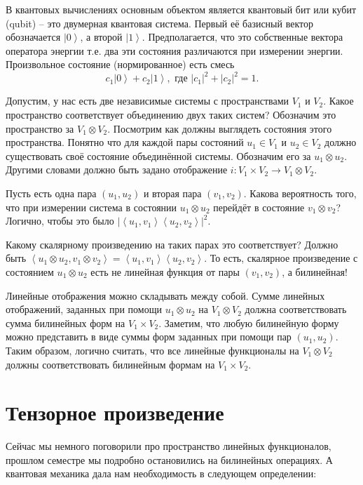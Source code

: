 \documentclass[10pt,a4paper,oneside]{book}
\theoremstyle{definition}
\def\lan{\left\langle }
\def\ran{\right\rangle}
\begin{document}
В квантовых вычислениях основным объектом является квантовый бит или кубит (qubit) -- это двумерная квантовая система. Первый её базисный вектор обозначается $\left|0\ran$, а второй $ \left|1\ran$. Предполагается, что это собственные вектора оператора энергии т.е. два эти состояния различаются при измерении энергии. Произвольное состояние (нормированное) есть смесь 
$$c_1 \left|0\ran+ c_2 \left| 1\ran, \text{ где } |c_1|^2+|c_2|^2=1.$$
 

Допустим, у нас есть две независимые системы с пространствами $V_1$ и $V_2$. Какое пространство соответствует  объединению двух таких систем? Обозначим это пространство за $V_1\otimes V_2$. Посмотрим как должны выглядеть состояния этого пространства. Понятно что для каждой пары состояний $u_1\in V_1$ и $u_2\in V_2$ должно существовать своё состояние объединённой системы. Обозначим его за $u_1 \otimes u_2$. Другими словами должно быть задано отображение $i\colon V_1\times V_2\to V_1 \otimes V_2$.

Пусть есть одна пара $(u_1,u_2)$ и вторая пара $(v_1,v_2)$. Какова вероятность того, что при измерении система в состоянии $u_1\otimes u_2$ перейдёт  в состояние $v_1 \otimes v_2$? Логично, чтобы это было $|\lan u_1,v_1 \ran \lan u_2, v_2\ran|^2$.

Какому скалярному произведению на таких парах это соответствует? Должно быть $\lan u_1\otimes u_2, v_1\otimes v_2\ran = \lan u_1,v_1 \ran \lan u_2, v_2\ran$. То есть, скалярное произведение с состоянием $u_1\otimes u_2$ есть не линейная функция от пары $(v_1, v_2)$, а билинейная!



Линейные отображения можно складывать между собой. Сумме линейных отображений, заданных при помощи $u_1\otimes u_2$ на $V_1\otimes V_2$ должна соответствовать сумма билинейных форм на $V_1\times V_2$. Заметим, что любую билинейную форму можно представить в виде суммы форм заданных при помощи пар $(u_1,u_2)$. Таким образом, логично считать, что все линейные функционалы на $V_1\otimes V_2$ должны соответствовать билинейным формам на $V_1\times V_2$.





\section{Тензорное произведение}

Сейчас мы немного поговорили про пространство линейных функционалов, прошлом семестре мы подробно остановились на билинейных операциях. А квантовая механика дала нам необходимость в следующем определении:
\end{document}
